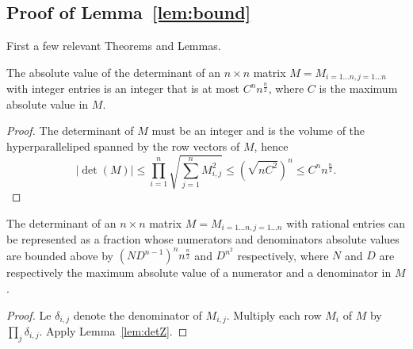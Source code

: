 \subsection{Proof of Lemma~\ref*{lem:bound}}%
\label{app:bound}

First a few relevant Theorems and Lemmas.



\begin{lemma}\label{lem:detZ}
	The absolute value of the determinant of an $n\times n$ matrix $M =
	M_{i=1\ldots n,j=1\ldots n}$ with integer entries is an integer that is at
	most $C^n n^{\frac n2}$, where $C$ is the maximum absolute value in $M$.
\end{lemma}
\begin{proof}
	The determinant of $M$ must be an integer
	and is the volume of the
	hyperparalleliped spanned by the row vectors of $M$, hence
	$$
	|\det(M)| \le \prod_{i=1}^n \sqrt{\sum_{j=1}^{n} M_{i,j}^2} \le {(\sqrt{n C^2})}^{n} \le C^n n^\frac n2.
	$$
\end{proof}

\begin{lemma}\label{lem:detQ}
	The determinant of an $n\times n$ matrix $M = M_{i=1\ldots n,j=1\ldots n}$ with
	rational entries can be represented as a fraction whose numerators and
	denominators absolute values are bounded above by
	${(ND^{n-1})}^n n^{\frac n2}$ and $D^{n^2}$
	respectively, where $N$ and $D$
	are respectively the maximum absolute value of a numerator and a
	denominator in $M$.
\end{lemma}
\begin{proof}
	Le $\delta_{i,j}$ denote the denominator of $M_{i,j}$.
	Multiply each row $M_i$ of $M$ by $\prod_j \delta_{i,j}$.
	Apply Lemma~\ref{lem:detZ}.
\end{proof}

